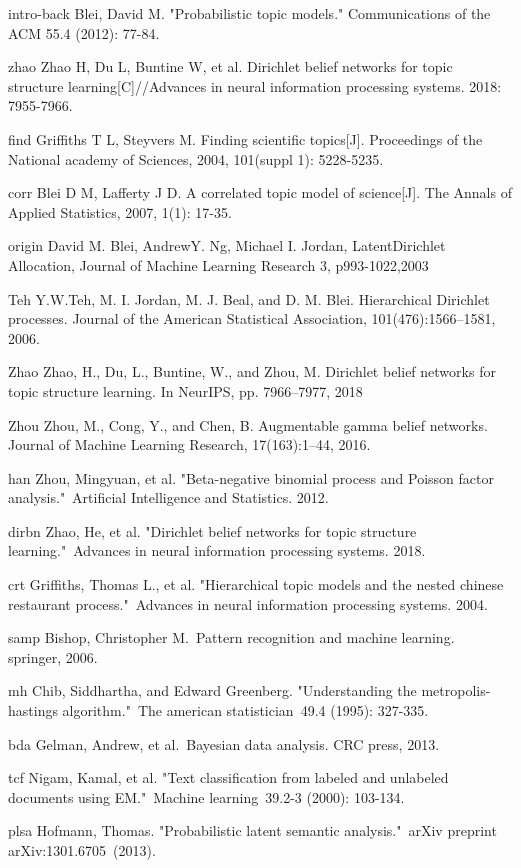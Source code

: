 \clearpage
{}

\begin{thebibliography}{999}

\bibitem
{intro-back}
Blei, David M. "Probabilistic topic models." Communications of the ACM 55.4 (2012): 77-84.

\bibitem
{zhao}
Zhao H, Du L, Buntine W, et al. Dirichlet belief networks for topic structure learning[C]//Advances in neural information processing systems. 2018: 7955-7966.

\bibitem
{find}
Griffiths T L, Steyvers M. Finding scientific topics[J]. Proceedings of the National academy of Sciences, 2004, 101(suppl 1): 5228-5235.

\bibitem
{corr}
Blei D M, Lafferty J D. A correlated topic model of science[J]. The Annals of Applied Statistics, 2007, 1(1): 17-35.

\bibitem
{origin}
David M. Blei, AndrewY. Ng, Michael I. Jordan,  LatentDirichlet Allocation, Journal of Machine Learning Research 3, p993-1022,2003

\bibitem
{Teh}
Y.W.Teh, M. I. Jordan, M. J. Beal, and D. M. Blei. Hierarchical Dirichlet processes. Journal of the American Statistical Association, 101(476):1566–1581, 2006.

\bibitem
{Zhao}
Zhao, H., Du, L., Buntine, W., and Zhou, M. Dirichlet
belief networks for topic structure learning. In NeurIPS,
pp. 7966–7977, 2018

\bibitem
{Zhou}
Zhou, M., Cong, Y., and Chen, B. Augmentable gamma
belief networks. Journal of Machine Learning Research,
17(163):1–44, 2016.

\bibitem
{han}
Zhou, Mingyuan, et al. "Beta-negative binomial process and Poisson factor analysis." Artificial Intelligence and Statistics. 2012.

\bibitem
{dirbn}
Zhao, He, et al. "Dirichlet belief networks for topic structure learning." Advances in neural information processing systems. 2018.

\bibitem
{crt}
Griffiths, Thomas L., et al. "Hierarchical topic models and the nested chinese restaurant process." Advances in neural information processing systems. 2004.

\bibitem
{samp}
Bishop, Christopher M. Pattern recognition and machine learning. springer, 2006.

\bibitem
{mh}
Chib, Siddhartha, and Edward Greenberg. "Understanding the metropolis-hastings algorithm." The american statistician 49.4 (1995): 327-335.

\bibitem
{bda}
Gelman, Andrew, et al. Bayesian data analysis. CRC press, 2013.

\bibitem
{tcf}
Nigam, Kamal, et al. "Text classification from labeled and unlabeled documents using EM." Machine learning 39.2-3 (2000): 103-134.

\bibitem
{plsa}
Hofmann, Thomas. "Probabilistic latent semantic analysis." arXiv preprint arXiv:1301.6705 (2013).

\end{thebibliography}
